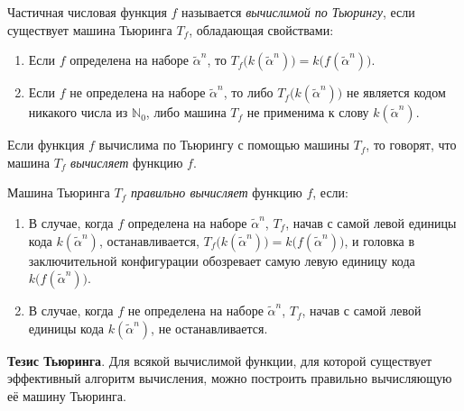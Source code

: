 \begin{definition*}
    Частичная числовая функция $f$ называется \textit{вычислимой по Тьюрингу}, если существует машина Тьюринга $T_f$, обладающая свойствами:
    \begin{enumerate}
        \item Если $f$ определена на наборе $\widetilde\alpha^n$, то $T_f\big(k(\widetilde\alpha^n)\big) = k\big(f(\widetilde\alpha^n)\big)$.
        \item Если $f$ не определена на наборе $\widetilde\alpha^n$, то либо $T_f\big(k(\widetilde\alpha^n)\big)$ не является кодом никакого числа из $\mathbb{N}_0$, либо машина $T_f$ не применима к слову $k(\widetilde\alpha^n)$.
    \end{enumerate}
    Если функция $f$ вычислима по Тьюрингу с помощью машины $T_f$, то говорят, что машина $T_f$ \textit{вычисляет} функцию $f$.
\end{definition*}

\begin{definition*}
    Машина Тьюринга $T_f$ \textit{правильно вычисляет} функцию $f$, если:
    \begin{enumerate}
        \item В случае, когда $f$ определена на наборе $\widetilde\alpha^n$, $T_f$, начав с самой левой единицы кода $k(\widetilde\alpha^n)$, останавливается, $T_f\big(k(\widetilde\alpha^n)\big) = k\big(f(\widetilde\alpha^n)\big)$, и головка в заключительной конфигурации обозревает самую левую единицу кода $k\big(f(\widetilde\alpha^n)\big)$.
        \item В случае, когда $f$ не определена на наборе $\widetilde\alpha^n$, $T_f$, начав с самой левой единицы кода $k(\widetilde\alpha^n)$, не останавливается.
    \end{enumerate}
\end{definition*}

\textbf{Тезис Тьюринга}. Для всякой вычислимой функции, для которой существует эффективный алгоритм вычисления, можно построить правильно вычисляющую её машину Тьюринга. 